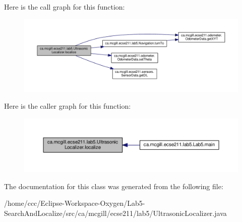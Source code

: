 Here is the call graph for this function\+:\nopagebreak
\begin{figure}[H]
\begin{center}
\leavevmode
\includegraphics[width=350pt]{classca_1_1mcgill_1_1ecse211_1_1lab5_1_1_ultrasonic_localizer_a7fd82ab7240a07ae6947313c0769d4bc_cgraph}
\end{center}
\end{figure}
Here is the caller graph for this function\+:\nopagebreak
\begin{figure}[H]
\begin{center}
\leavevmode
\includegraphics[width=350pt]{classca_1_1mcgill_1_1ecse211_1_1lab5_1_1_ultrasonic_localizer_a7fd82ab7240a07ae6947313c0769d4bc_icgraph}
\end{center}
\end{figure}


The documentation for this class was generated from the following file\+:\begin{DoxyCompactItemize}
\item 
/home/ccc/\+Eclipse-\/\+Workspace-\/\+Oxygen/\+Lab5-\/\+Search\+And\+Localize/src/ca/mcgill/ecse211/lab5/Ultrasonic\+Localizer.\+java\end{DoxyCompactItemize}

